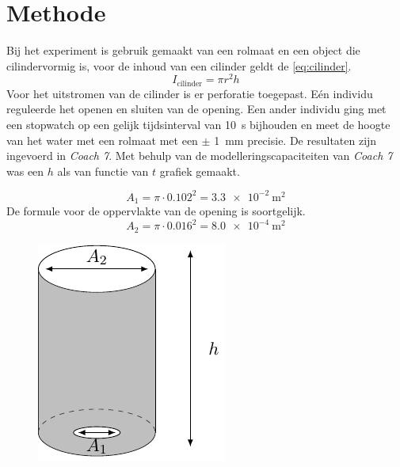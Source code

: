 \documentclass[numbers=endperiod]{scrartcl}
\begin{document}
\section{Methode}
Bij het experiment is gebruik gemaakt van een rolmaat en een object die cilindervormig is, voor de inhoud van een cilinder geldt de \ref{eq:cilinder}. 
\begin{equation}\label{eq:cilinder}
    I_{\text{cilinder}} = \pi r^2h
\end{equation}
Voor het uitstromen van de cilinder is er perforatie toegepast. Eén individu reguleerde het openen en sluiten van de opening. Een ander individu ging met een stopwatch op een gelijk tijdsinterval van \SI{10}{\second} bijhouden en meet de hoogte van het water met een rolmaat met een $\pm$ \SI{1}{\milli\meter} precisie. De resultaten zijn ingevoerd in \textit{Coach 7}. Met behulp van de modelleringscapaciteiten van \textit{Coach 7} was een $h$ als van functie van $t$ grafiek gemaakt.  


\begin{equation}
    A_1 = \pi \cdot 0.102^2 = \SI{3.3e-2}{\meter\squared}
\end{equation}
 De formule voor de oppervlakte van de opening is soortgelijk.
\begin{equation}
    A_2 = \pi \cdot 0.016^2 = \SI{8.0e-4}{\meter\squared}
\end{equation}

\begin{figure}[ht]
\centering
\includegraphics[scale=0.8]{beker.pdf}    
\label{fig:cilinder}
\end{figure}
\end{document}
